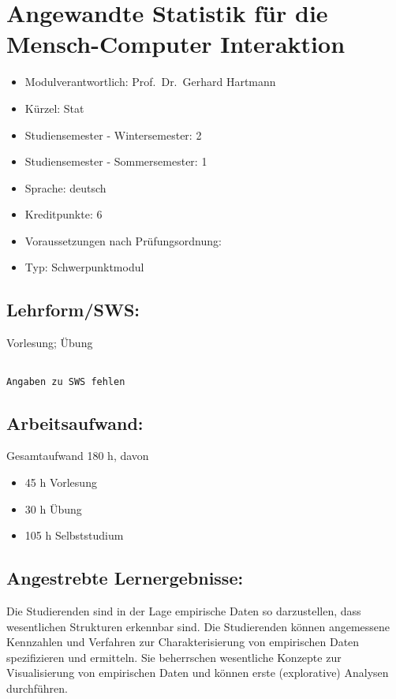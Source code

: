 \chapter{Angewandte Statistik für die Mensch-Computer
Interaktion}\label{angewandte-statistik-fuxfcr-die-mensch-computer-interaktion}

\begin{itemize}
\tightlist
\item
  Modulverantwortlich: Prof.~Dr.~Gerhard Hartmann
\item
  Kürzel: Stat
\item
  Studiensemester - Wintersemester: 2
\item
  Studiensemester - Sommersemester: 1
\item
  Sprache: deutsch
\item
  Kreditpunkte: 6
\item
  Voraussetzungen nach Prüfungsordnung:
\item
  Typ: Schwerpunktmodul
\end{itemize}

\section*{Lehrform/SWS:}\label{lehrformsws-6}

Vorlesung; Übung

\begin{verbatim}

Angaben zu SWS fehlen
\end{verbatim}

\section*{Arbeitsaufwand:}\label{arbeitsaufwand-12}

Gesamtaufwand 180 h, davon

\begin{itemize}
\tightlist
\item
  45 h Vorlesung
\item
  30 h Übung
\item
  105 h Selbststudium
\end{itemize}

\section*{Angestrebte
Lernergebnisse:}\label{angestrebte-lernergebnisse-6}

Die Studierenden sind in der Lage empirische Daten so darzustellen, dass
wesentlichen Strukturen erkennbar sind. Die Studierenden können
angemessene Kennzahlen und Verfahren zur Charakterisierung von
empirischen Daten spezifizieren und ermitteln. Sie beherrschen
wesentliche Konzepte zur Visualisierung von empirischen Daten und können
erste (explorative) Analysen durchführen.

